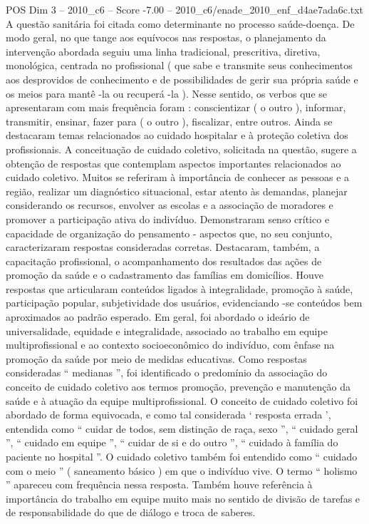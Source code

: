 \begin{textsample}{POS Dim 3 – 2010\_c6 – Score -7.00 – 2010\_c6/enade\_2010\_enf\_d4ae7ada6c.txt}
A questão sanitária foi citada como determinante no processo saúde-doença.
De modo geral, no que tange aos equívocos nas respostas, o planejamento da intervenção abordada seguiu uma linha tradicional, prescritiva, diretiva, monológica, centrada no profissional ( que sabe e transmite seus conhecimentos aos desprovidos de conhecimento e de possibilidades de gerir sua própria saúde e os meios para mantê -la ou recuperá -la ).
Nesse sentido, os verbos que se apresentaram com mais frequência foram : conscientizar ( o outro ), informar, transmitir, ensinar, fazer para ( o outro ), fiscalizar, entre outros.
Ainda se destacaram temas relacionados ao cuidado hospitalar e à proteção coletiva dos profissionais.
A conceituação de cuidado coletivo, solicitada na questão, sugere a obtenção de respostas que contemplam aspectos importantes relacionados ao cuidado coletivo.
Muitos se referiram à importância de conhecer as pessoas e a região, realizar um diagnóstico situacional, estar atento às demandas, planejar considerando os recursos, envolver as escolas e a associação de moradores e promover a participação ativa do indivíduo.
Demonstraram senso crítico e capacidade de organização do pensamento - aspectos que, no seu conjunto, caracterizaram respostas consideradas corretas.
Destacaram, também, a capacitação profissional, o acompanhamento dos resultados das ações de promoção da saúde e o cadastramento das famílias em domicílios.
Houve respostas que articularam conteúdos ligados à integralidade, promoção à saúde, participação popular, subjetividade dos usuários, evidenciando -se conteúdos bem aproximados ao padrão esperado.
Em geral, foi abordado o ideário de universalidade, equidade e integralidade, associado ao trabalho em equipe multiprofissional e ao contexto socioeconômico do indivíduo, com ênfase na promoção da saúde por meio de medidas educativas.
Como respostas consideradas “ medianas ”, foi identificado o predomínio da associação do conceito de cuidado coletivo aos termos promoção, prevenção e manutenção da saúde e à atuação da equipe multiprofissional.
O conceito de cuidado coletivo foi abordado de forma equivocada, e como tal considerada ‘ resposta errada ’, entendida como “ cuidar de todos, sem distinção de raça, sexo ”, “ cuidado geral ”, “ cuidado em equipe ”, “ cuidar de si e do outro ”, “ cuidado à família do paciente no hospital ”.
O cuidado coletivo também foi entendido como “ cuidado com o meio ” ( saneamento básico ) em que o indivíduo vive.
O termo “ holismo ” apareceu com frequência nessa resposta.
Também houve referência à importância do trabalho em equipe muito mais no sentido de divisão de tarefas e de responsabilidade do que de diálogo e troca de saberes.

\end{textsample}
